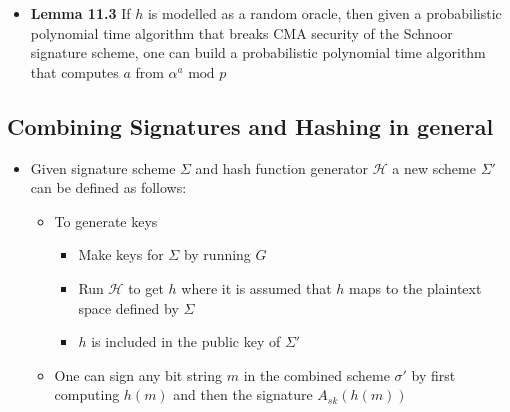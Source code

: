 \begin{itemize}
  \item \textbf{Lemma 11.3} If $h$ is modelled as a random oracle, then given a probabilistic polynomial time algorithm that breaks CMA security of the Schnoor signature scheme, one can build a probabilistic polynomial time algorithm that computes $a$ from $\alpha ^a \text{ mod } p$ 
\end{itemize}

\subsection{Combining Signatures and Hashing in general}
\begin{itemize}
  \item Given signature scheme $\Sigma$ and hash function generator $\mathcal H$ a new scheme $\Sigma'$ can be defined as follows:
  \begin{itemize}
  	\item To generate keys
    \begin{itemize}
  		\item Make keys for $\Sigma$ by running $G$
  		\item Run $\mathcal H$ to get $h$ where it is assumed that $h$ maps to the plaintext space defined by $\Sigma$
  		\item $h$ is included in the public key of $\Sigma '$
    \end{itemize}
  	\item One can sign any bit string $m$ in the combined scheme $\sigma'$ by first computing $h(m)$ and then the signature $A_{s k}(h(m))$
  \end{itemize}


\end{itemize}
